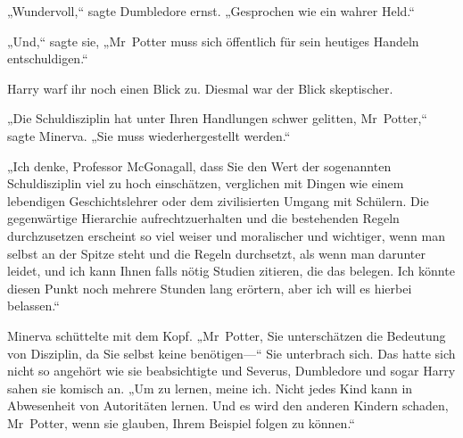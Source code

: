„Wundervoll,“ sagte Dumbledore ernst. „Gesprochen wie ein wahrer Held.“

„Und,“ sagte sie, „Mr~Potter muss sich öffentlich für sein heutiges Handeln entschuldigen.“

Harry warf ihr noch einen Blick zu. Diesmal war der Blick skeptischer.

„Die Schuldisziplin hat unter Ihren Handlungen schwer gelitten, Mr~Potter,“ sagte Minerva. „Sie muss wiederhergestellt werden.“

„Ich denke, Professor McGonagall, dass Sie den Wert der sogenannten Schuldisziplin viel zu hoch einschätzen, verglichen mit Dingen wie einem lebendigen Geschichtslehrer oder dem zivilisierten Umgang mit Schülern. Die gegenwärtige Hierarchie aufrechtzuerhalten und die bestehenden Regeln durchzusetzen erscheint so viel weiser und moralischer und wichtiger, wenn man selbst an der Spitze steht und die Regeln durchsetzt, als wenn man darunter leidet, und ich kann Ihnen falls nötig Studien zitieren, die das belegen. Ich könnte diesen Punkt noch mehrere Stunden lang erörtern, aber ich will es hierbei belassen.“

Minerva schüttelte mit dem Kopf. „Mr~Potter, Sie unterschätzen die Bedeutung von Disziplin, da Sie selbst keine benötigen—“ Sie unterbrach sich. Das hatte sich nicht so angehört wie sie beabsichtigte und Severus, Dumbledore und sogar Harry sahen sie komisch an. „Um zu lernen, meine ich. Nicht jedes Kind kann in Abwesenheit von Autoritäten lernen. Und es wird den anderen Kindern schaden, Mr~Potter, wenn sie glauben, Ihrem Beispiel folgen zu können.“

